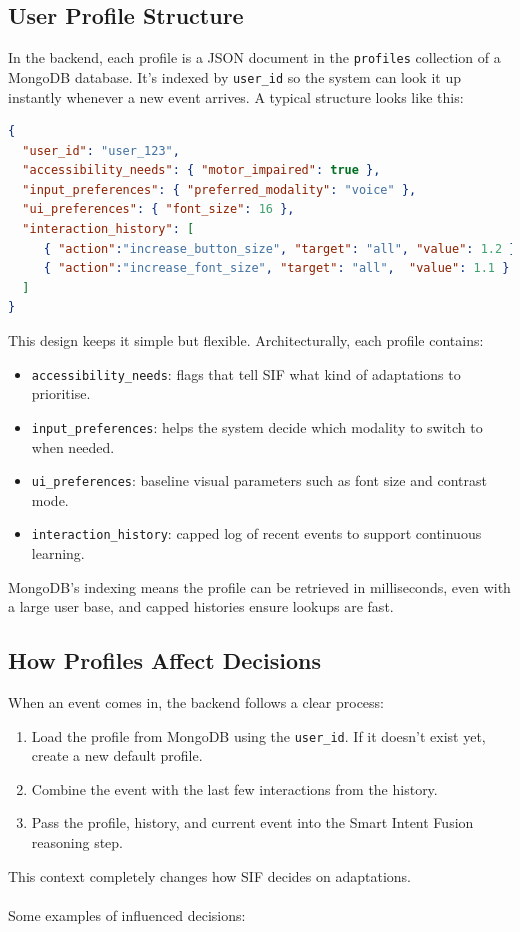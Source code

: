 \documentclass[openany]{book}
\begin{document}
\subsection{User Profile Structure}
In the backend, each profile is a JSON document in the \texttt{profiles} collection of a MongoDB database. It’s indexed by \texttt{user\_id} so the system can look it up instantly whenever a new event arrives. A typical structure looks like this:

\begin{lstlisting}[language=json, caption=Simplified User Profile Example]
{
  "user_id": "user_123",
  "accessibility_needs": { "motor_impaired": true },
  "input_preferences": { "preferred_modality": "voice" },
  "ui_preferences": { "font_size": 16 },
  "interaction_history": [
     { "action":"increase_button_size", "target": "all", "value": 1.2 },
     { "action":"increase_font_size", "target": "all",  "value": 1.1 } 
  ]
}
\end{lstlisting}

This design keeps it simple but flexible. Architecturally, each profile contains:
\begin{itemize}
    \item \texttt{accessibility\_needs}: flags that tell SIF what kind of adaptations to prioritise.
    \item \texttt{input\_preferences}: helps the system decide which modality to switch to when needed.
    \item \texttt{ui\_preferences}: baseline visual parameters such as font size and contrast mode.
    \item \texttt{interaction\_history}: capped log of recent events to support continuous learning.
\end{itemize}
MongoDB’s indexing means the profile can be retrieved in milliseconds, even with a large user base, and capped histories ensure lookups are fast.

\subsection{How Profiles Affect Decisions}
When an event comes in, the backend follows a clear process:
\begin{enumerate}
    \item Load the profile from MongoDB using the \texttt{user\_id}. If it doesn’t exist yet, create a new default profile.
    \item Combine the event with the last few interactions from the history.
    \item Pass the profile, history, and current event into the Smart Intent Fusion reasoning step.
\end{enumerate}
This context completely changes how SIF decides on adaptations.\\\\
Some examples of influenced decisions:
\end{document}
